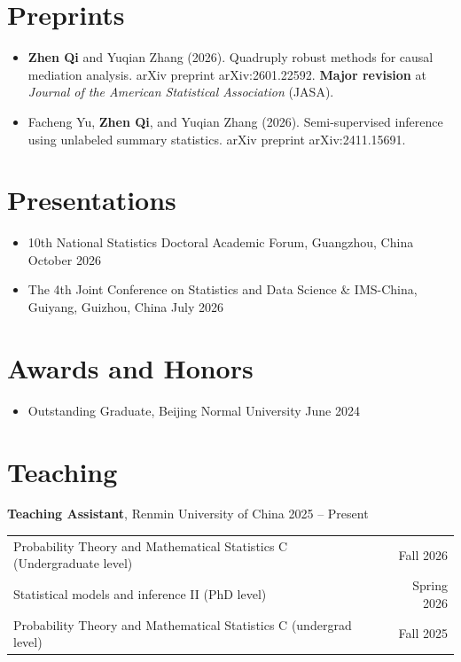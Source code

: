 \documentclass[11pt]{article}
\begin{document}
\section*{Preprints}

\begin{itemize}
    \item \textbf{Zhen Qi} and Yuqian Zhang (2026). Quadruply robust methods for causal mediation analysis. arXiv preprint arXiv:2601.22592. \textbf{Major revision} at \textit{Journal of the American Statistical Association} (JASA).
    \item Facheng Yu, \textbf{Zhen Qi}, and Yuqian Zhang (2026). Semi-supervised inference using unlabeled summary statistics. arXiv preprint arXiv:2411.15691.
\end{itemize}

\section*{Presentations}

\begin{itemize}
    \item 10th National Statistics Doctoral Academic Forum, Guangzhou, China \hfill October 2026
    \item The 4th Joint Conference on Statistics and Data Science \& IMS-China, Guiyang, Guizhou, China \hfill July 2026
\end{itemize}

\section*{Awards and Honors}

\begin{itemize}
    \item Outstanding Graduate, Beijing Normal University \hfill June 2024
\end{itemize}

\section*{Teaching}

\noindent
\textbf{Teaching Assistant}, Renmin University of China \hfill 2025 -- Present

\noindent
\begin{tabularx}{\textwidth}{@{} X r @{}}
Probability Theory and Mathematical Statistics C (Undergraduate level) & Fall 2026 \\
Statistical models and inference II (PhD level) & Spring 2026 \\
Probability Theory and Mathematical Statistics C (undergrad level) & Fall 2025 \\
\end{tabularx}
\end{document}
